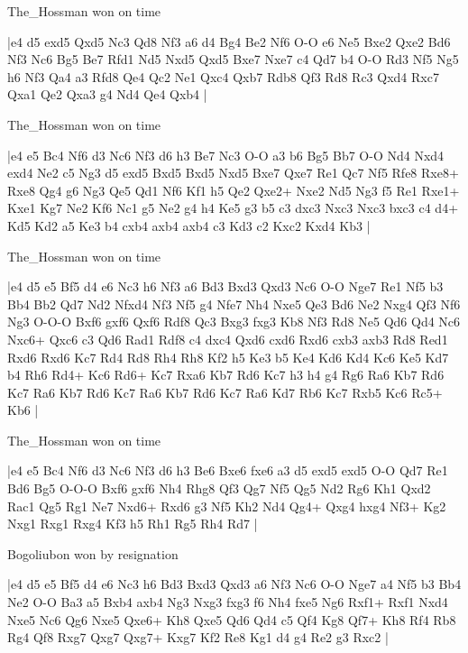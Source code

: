 \showboard

The\_Hossman won on time

\makegametitle
|e4 d5 exd5 Qxd5 Nc3 Qd8 Nf3 a6 d4 Bg4 Be2 Nf6 O-O e6 Ne5 Bxe2 Qxe2 Bd6 Nf3 Nc6 Bg5 Be7 Rfd1 Nd5 Nxd5 Qxd5 Bxe7 Nxe7 c4 Qd7 b4 O-O Rd3 Nf5 Ng5 h6 Nf3 Qa4 a3 Rfd8 Qe4 Qc2 Ne1 Qxc4 Qxb7 Rdb8 Qf3 Rd8 Rc3 Qxd4 Rxc7 Qxa1 Qe2 Qxa3 g4 Nd4 Qe4 Qxb4  |

\showboard

The\_Hossman won on time

\makegametitle
|e4 e5 Bc4 Nf6 d3 Nc6 Nf3 d6 h3 Be7 Nc3 O-O a3 b6 Bg5 Bb7 O-O Nd4 Nxd4 exd4 Ne2 c5 Ng3 d5 exd5 Bxd5 Bxd5 Nxd5 Bxe7 Qxe7 Re1 Qc7 Nf5 Rfe8 Rxe8+ Rxe8 Qg4 g6 Ng3 Qe5 Qd1 Nf6 Kf1 h5 Qe2 Qxe2+ Nxe2 Nd5 Ng3 f5 Re1 Rxe1+ Kxe1 Kg7 Ne2 Kf6 Nc1 g5 Ne2 g4 h4 Ke5 g3 b5 c3 dxc3 Nxc3 Nxc3 bxc3 c4 d4+ Kd5 Kd2 a5 Ke3 b4 cxb4 axb4 axb4 c3 Kd3 c2 Kxc2 Kxd4 Kb3  |

\showboard

The\_Hossman won on time

\makegametitle
|e4 d5 e5 Bf5 d4 e6 Nc3 h6 Nf3 a6 Bd3 Bxd3 Qxd3 Nc6 O-O Nge7 Re1 Nf5 b3 Bb4 Bb2 Qd7 Nd2 Nfxd4 Nf3 Nf5 g4 Nfe7 Nh4 Nxe5 Qe3 Bd6 Ne2 Nxg4 Qf3 Nf6 Ng3 O-O-O Bxf6 gxf6 Qxf6 Rdf8 Qc3 Bxg3 fxg3 Kb8 Nf3 Rd8 Ne5 Qd6 Qd4 Nc6 Nxc6+ Qxc6 c3 Qd6 Rad1 Rdf8 c4 dxc4 Qxd6 cxd6 Rxd6 cxb3 axb3 Rd8 Red1 Rxd6 Rxd6 Kc7 Rd4 Rd8 Rh4 Rh8 Kf2 h5 Ke3 b5 Ke4 Kd6 Kd4 Kc6 Ke5 Kd7 b4 Rh6 Rd4+ Kc6 Rd6+ Kc7 Rxa6 Kb7 Rd6 Kc7 h3 h4 g4 Rg6 Ra6 Kb7 Rd6 Kc7 Ra6 Kb7 Rd6 Kc7 Ra6 Kb7 Rd6 Kc7 Ra6 Kd7 Rb6 Kc7 Rxb5 Kc6 Rc5+ Kb6  |

\showboard

The\_Hossman won on time

\makegametitle
|e4 e5 Bc4 Nf6 d3 Nc6 Nf3 d6 h3 Be6 Bxe6 fxe6 a3 d5 exd5 exd5 O-O Qd7 Re1 Bd6 Bg5 O-O-O Bxf6 gxf6 Nh4 Rhg8 Qf3 Qg7 Nf5 Qg5 Nd2 Rg6 Kh1 Qxd2 Rac1 Qg5 Rg1 Ne7 Nxd6+ Rxd6 g3 Nf5 Kh2 Nd4 Qg4+ Qxg4 hxg4 Nf3+ Kg2 Nxg1 Rxg1 Rxg4 Kf3 h5 Rh1 Rg5 Rh4 Rd7  |

\showboard

Bogoliubon won by resignation

\makegametitle
|e4 d5 e5 Bf5 d4 e6 Nc3 h6 Bd3 Bxd3 Qxd3 a6 Nf3 Nc6 O-O Nge7 a4 Nf5 b3 Bb4 Ne2 O-O Ba3 a5 Bxb4 axb4 Ng3 Nxg3 fxg3 f6 Nh4 fxe5 Ng6 Rxf1+ Rxf1 Nxd4 Nxe5 Nc6 Qg6 Nxe5 Qxe6+ Kh8 Qxe5 Qd6 Qd4 c5 Qf4 Kg8 Qf7+ Kh8 Rf4 Rb8 Rg4 Qf8 Rxg7 Qxg7 Qxg7+ Kxg7 Kf2 Re8 Kg1 d4 g4 Re2 g3 Rxc2  |

